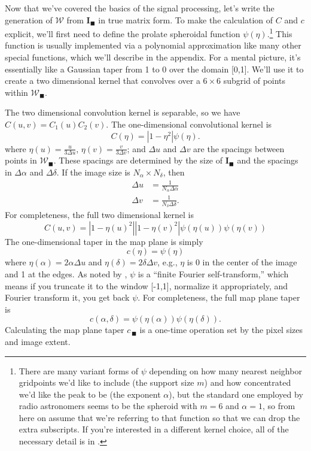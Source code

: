 \documentclass[modern]{aastex62}
\newcommand{\im}{\boldsymbol{I}_\blacksquare}
\newcommand{\vm}{\boldsymbol{\mathcal{W}}} %
\newcommand{\ct}{c_{\,\blacksquare}}
\begin{document}
Now that we've covered the basics of the signal processing, let's write the generation of $\vm$ from $\im$ in true matrix form. To make the calculation of $C$ and $c$ explicit, we'll first need to define the prolate spheroidal function $\psi(\eta)$.\footnote{There are many variant forms of $\psi$ depending on how many nearest neighbor gridpoints we'd like to include (the support size $m$) and how concentrated we'd like the peak to be (the exponent $\alpha$), but the standard one employed by radio astronomers seems to be the spheroid with $m = 6$ and $\alpha = 1$, so from here on assume that we're referring to that function so that we can drop the extra subscripts. If you're interested in a different kernel choice, all of the necessary detail is in \citet{schwab84}.} This function is usually implemented via a polynomial approximation like many other special functions, which we'll describe in the appendix. For a mental picture, it's essentially like a Gaussian taper from 1 to 0 over the domain [0,1]. We'll use it to create a two dimensional kernel that convolves over a $6 \times 6$ subgrid of points within $\vm_\blacksquare$.

The two dimensional convolution kernel is separable, so we have $C(u,v) = C_1(u)C_2(v)$. The one-dimensional convolutional kernel is 
\begin{equation}
    C(\eta) = |1 - \eta^2| \psi(\eta).
\end{equation}
where $\eta(u) = \frac{u}{3 \Delta u}$, $\eta(v) = \frac{v}{3 \Delta v}$; and $\Delta u$ and $\Delta v$ are the spacings between points in $\vm_\blacksquare$. These spacings are determined by the size of $\im$ and the spacings in $\Delta \alpha$ and $\Delta \delta$. If the image size is $N_\alpha \times N_\delta$, then
\begin{eqnarray}
    \Delta u &= \frac{1}{N_\alpha \Delta \alpha}\\
    \Delta v &= \frac{1}{N_\delta \Delta \delta}.
\end{eqnarray}
For completeness, the full two dimensional kernel is
\begin{equation}
    C(u,v) = |1 - \eta(u)^2| |1 - \eta(v)^2| \psi(\eta(u)) \psi(\eta(v)) 
\end{equation}
The one-dimensional taper in the map plane is simply 
\begin{equation}
    c(\eta) = \psi(\eta)
\end{equation}
where $\eta(\alpha) = 2 \alpha \Delta u$ and  $\eta(\delta) = 2 \delta \Delta v$, e.g., $\eta$ is 0 in the center of the image and 1 at the edges. As noted by \citet{synthesis99}, $\psi$ is a ``finite Fourier self-transform,'' which means if you truncate it to the window [-1,1], normalize it appropriately, and Fourier transform it, you get back $\psi$. For completeness, the full map plane taper is 
\begin{equation}
    c(\alpha, \delta) = \psi(\eta(\alpha)) \psi(\eta(\delta)).
\end{equation}
Calculating the map plane taper $\ct$ is a one-time operation set by the pixel sizes and image extent. 
\end{document}
